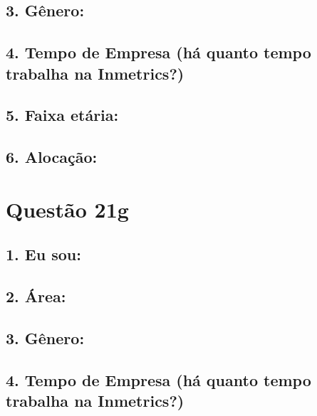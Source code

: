 \documentclass[]{book}
\begin{document}
\hypertarget{genero-66}{%
\subsection{3. Gênero:}\label{genero-66}}

\hypertarget{tempo-de-empresa-ha-quanto-tempo-trabalha-na-inmetrics-66}{%
\subsection{4. Tempo de Empresa (há quanto tempo trabalha na Inmetrics?)}\label{tempo-de-empresa-ha-quanto-tempo-trabalha-na-inmetrics-66}}

\hypertarget{faixa-etaria-66}{%
\subsection{5. Faixa etária:}\label{faixa-etaria-66}}

\hypertarget{alocacao-66}{%
\subsection{6. Alocação:}\label{alocacao-66}}

\hypertarget{questao-21g}{%
\section{Questão 21g}\label{questao-21g}}

\hypertarget{eu-sou-67}{%
\subsection{1. Eu sou:}\label{eu-sou-67}}

\hypertarget{area-67}{%
\subsection{2. Área:}\label{area-67}}

\hypertarget{genero-67}{%
\subsection{3. Gênero:}\label{genero-67}}

\hypertarget{tempo-de-empresa-ha-quanto-tempo-trabalha-na-inmetrics-67}{%
\subsection{4. Tempo de Empresa (há quanto tempo trabalha na Inmetrics?)}\label{tempo-de-empresa-ha-quanto-tempo-trabalha-na-inmetrics-67}}
\end{document}

